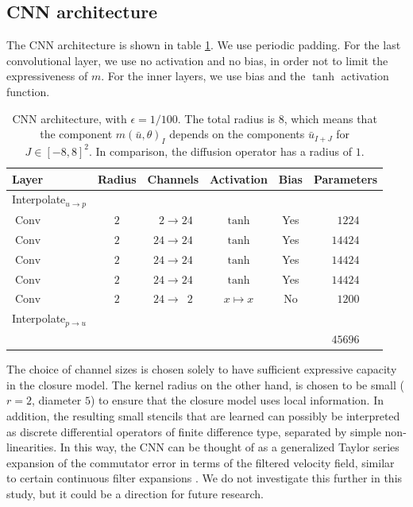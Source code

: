 \documentclass[preprint]{elsarticle}
\newcommand{\p}{\phantom{0}}
\begin{document}
\subsection{CNN architecture} \label{sec:architecture}

The CNN architecture is shown in table \ref{tab:cnn}. We use periodic padding.
For the last convolutional layer, we use no activation and no bias, in order not
to limit the expressiveness of $m$. For the inner layers, we use bias and
the $\tanh$ activation function.

\begin{table}
    \centering
    \begin{tabular}{l c c c c c}
    \toprule

    Layer &
    Radius &
    Channels &
    Activation &
    Bias &
    Parameters \\
    
    \midrule

    Interpolate$_{u \to p}$   &     &               &               &     &           \\
    $\operatorname{Conv}$     & $2$ & $\p 2 \to 24$ & $\tanh$       & Yes & $\p 1224$ \\
    $\operatorname{Conv}$     & $2$ & $24 \to 24$   & $\tanh$       & Yes &   $14424$ \\
    $\operatorname{Conv}$     & $2$ & $24 \to 24$   & $\tanh$       & Yes &   $14424$ \\
    $\operatorname{Conv}$     & $2$ & $24 \to 24$   & $\tanh$       & Yes &   $14424$ \\
    $\operatorname{Conv}$     & $2$ & $24 \to \p 2$ & $x \mapsto x$ &  No & $\p 1200$ \\
    Interpolate$_{p \to u}$   &     &               &               &     &           \\ \midrule
                              &     &               &               &     &   $45696$
\end{tabular}


    \caption{CNN architecture, with $\epsilon = 1 / 100$. The total radius is
        $8$, which means that the component $m(\bar{u}, \theta)_I$ depends on
        the components $\bar{u}_{I + J}$ for $J \in [-8, 8]^2$. In comparison,
        the diffusion operator has a radius of $1$.}
    \label{tab:cnn}
\end{table}

The choice of channel sizes is chosen solely to have sufficient expressive
capacity in the closure model. The kernel radius on the other hand, is chosen to
be small ($r = 2$, diameter $5$) to ensure that the closure model uses local
information. In addition, the resulting small stencils that are learned can 
possibly be interpreted as discrete differential operators of finite difference
type, separated by simple non-linearities. In this way, the CNN can be thought
of as a generalized Taylor series expansion of the commutator error in terms of
the filtered velocity field, similar to certain continuous filter expansions
\cite{Sagaut2005}. We do not investigate this further in this study, but it
could be a direction for future research.
\end{document}
